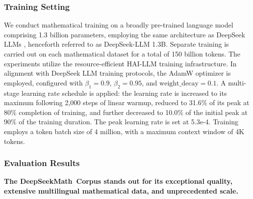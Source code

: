\subsubsection{Training Setting}
\label{sec:quality-policy}
We conduct mathematical training on a broadly pre-trained language model comprising 1.3 billion parameters, employing the same architecture as DeepSeek LLMs \citep{deepseek-llm}, henceforth referred to as DeepSeek-LLM 1.3B. Separate training is carried out on each mathematical dataset for a total of 150 billion tokens. The experiments utilize the resource-efficient HAI-LLM \citep{haillm} training infrastructure. In alignment with DeepSeek LLM training protocols, the AdamW optimizer \citep{adamW} is employed, configured with $\beta_1=0.9$, $\beta_2=0.95$, and $\mathrm{weight\_decay}=0.1$. A multi-stage learning rate schedule is applied: the learning rate is increased to its maximum following 2,000 steps of linear warmup, reduced to 31.6\% of its peak at 80\% completion of training, and further decreased to 10.0\% of the initial peak at 90\% of the training duration. The peak learning rate is set at 5.3e-4. Training employs a token batch size of 4 million, with a maximum context window of 4K tokens.

\subsubsection{Evaluation Results}

\textbf{The DeepSeekMath~Corpus stands out for its exceptional quality, extensive multilingual mathematical data, and unprecedented scale.}

